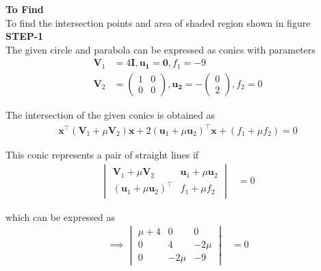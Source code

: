 \documentclass[10pt,a4paper]{report}
\newcommand{\myvec}[1]{\ensuremath{\begin{pmatrix}#1\end{pmatrix}}}
\let\vec\mathbf
\let\vec\mathbf
\newcommand{\mydet}[1]{\ensuremath{\begin{vmatrix}#1\end{vmatrix}}}
\providecommand{\brak}[1]{\ensuremath{\left(#1\right)}}
\begin{document}
\begin{multicols}{2}
\textbf{To Find }\vspace{2mm}\\
To find the intersection points and area of shaded region shown in figure\vspace{2mm}  \\ 
\textbf{STEP-1}\vspace{2mm}\\
\fi
The given circle and parabola can be expressed as conics with parameters 
\begin{align}
	\vec{V}_1&=4\vec{I},
\vec{u_1}=\vec{0},
f_1=-9
\\
	\vec{V}_2&=\myvec{
1 & 0\\
0 & 0
},
\vec{u_2}= -\myvec{
0\\
2
},
f_2=0
\end{align} 

The intersection of the given conics is obtained
as
\begin{align}
	\vec{x}^{\top}\brak{\vec{V}_1 + \mu\vec{V}_2}\vec{x}+2 \brak{\vec{u}_1+\mu \vec{u}_2}^{\top} \vec{x} 
	+ \brak{f_1+\mu f_2}= 0
    \end{align}

This conic represents a pair of straight lines if
\begin{align}
\mydet{\vec{V}_1 + \mu\vec{V}_2 & \vec{u}_1+\mu \vec{u}_2\\ \brak{\vec{u}_1+\mu \vec{u}_2}^{\top} & f_1 + \mu f_2} &= 0
\end{align}

which can be expressed as
\begin{align}
\implies \mydet{\mu+4 & 0 & 0\\ 
0 & 4 & -2\mu \\
0 & -2\mu & -9
} &= 0
\end{align}

\end{multicols}
\end{document}
